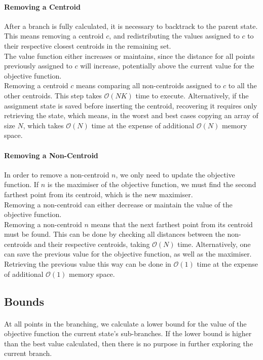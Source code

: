 \paragraph{Removing a Centroid}
After a branch is fully calculated, it is necessary to backtrack to the parent state.
This means removing a centroid $c$, and redistributing the values assigned to $c$ to their respective closest centroids in the remaining set. \\
The value function either increases or maintains, since the distance for all points previously assigned to $c$ will increase, potentially above the current value for the objective function.\\
Removing a centroid $c$ means comparing all non-centroids assigned to $c$ to all the other centroids. This step takes $\mathcal{O}(NK)$ time to execute. Alternatively, if the assignment state is saved before inserting the centroid, recovering it requires only retrieving the state, which means, in the worst and best cases copying an array of size $N$, which takes $\mathcal{O}(N)$ time at the expense of additional $\mathcal{O}(N)$ memory space.

\paragraph{Removing a Non-Centroid}
In order to remove a non-centroid $n$, we only need to update the objective function. If $n$ is the maximiser of the objective function, we must find the second farthest point from its centroid, which is the new maximiser.\\
Removing a non-centroid can either decrease or maintain the value of the objective function.\\
Removing a non-centroid $n$ means that the next farthest point from its centroid must be found. This can be done by checking all distances between the non-centroids and their respective centroids, taking $\mathcal{O}(N)$ time. Alternatively, one can save the previous value for the objective function, as well as the maximiser. Retrieving the previous value this way can be done in $\mathcal{O}(1)$ time at the expense of additional $\mathcal{O}(1)$ memory space.
\subsection{Bounds}
\paragraph{}
At all points in the branching, we calculate a lower bound for the value of the objective function the current state's sub-branches. If the lower bound is higher than the best value calculated, then there is no purpose in further exploring the current branch.

